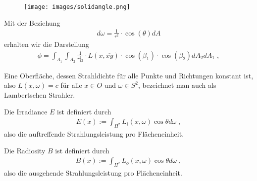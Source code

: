 \begin{figure}[H]
        \centering
         \texttt{[image: images/solidangle.png]}
    \label{fig:shadowmap3}
\end{figure}
Mit der Beziehung \begin{align}
d\omega =  \frac{1}{r^2} \cdot  \cos(\theta) dA
\end{align}     
erhalten wir die Darstellung
\begin{align}
\phi = \int_{A_1} \int_{A_2} \frac{1}{r_{12}^2}  \cdot L(x, \overline{xy}) \cdot \cos(\beta_1) \cdot \cos(\beta_2)  d A_2 dA_1 \; ,
\end{align}

\begin{Definition}
Eine Oberfläche, dessen Strahldichte für alle Punkte und Richtungen konstant ist, also
$L(x, \omega) = c$  für alle $x \in O$ und $\omega \in S^2$, bezeichnet man auch als Lambertschen Strahler. 
\end{Definition}

\begin{Definition}
Die Irradiance $E$ ist definiert durch
\begin{align}
E(x) := \int_{H^2} L_i(x, \omega) \cos{\theta} d\omega \; ,
\end{align}
also die auftreffende Strahlungsleistung pro Flächeneinheit. 
\end{Definition}

\begin{Definition}
Die Radiosity $B$ ist definiert durch
\begin{align}
B(x) := \int_{H^2} L_o(x, \omega) \cos{\theta} d\omega \; ,
\end{align}
also die ausgehende Strahlungsleistung pro Flächeneinheit. 
\end{Definition}




